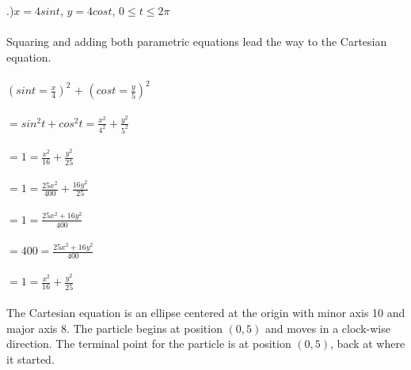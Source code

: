 \documentclass[12pt]{article}
\begin{document}
.)$x=4sin{t}$, $y=4cos{t}$, $0 \leq t \leq 2\pi$ \\\\
Squaring and adding both parametric equations lead the way to the Cartesian equation.\\\\
$(sin{t}=\frac{x}{4})^{2}$ $+$ $(cos{t}=\frac{y}{5})^2$\\\\
$=sin^{2}{t} + cos^{2}{t} = \frac{x^{2}}{4^{2}} + \frac{y^{2}}{5^{2}}$\\\\
$=1 = \frac{x^{2}}{16} + \frac{y^{2}}{25}$\\\\
$=1 = \frac{25x^{2}}{400} + \frac{16y^{2}}{25}$\\\\
$=1 = \frac{25x^{2} + 16y^{2}}{400}$\\\\
$=400 = \frac{25x^{2} + 16y^{2}}{400}$\\\\
$=1 = \frac{x^{2}}{16} + \frac{y^{2}}{25}$\\\\
The Cartesian equation is an ellipse centered at the origin with minor axis 10 and major axis 8. 
The particle begins at position $(0,5)$ and moves in a clock-wise direction. The terminal point for 
the particle is at position $(0,5)$, back at where it started.\\\\
\end{document}

